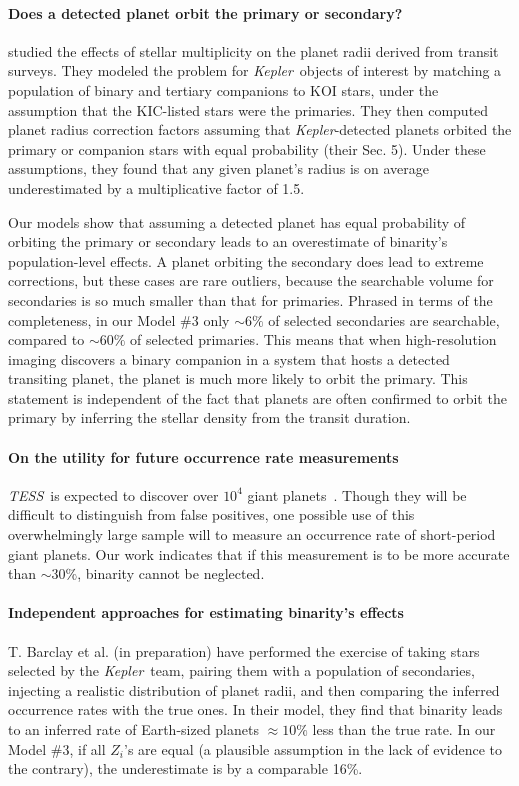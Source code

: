 \paragraph{Does a detected planet orbit the primary or secondary?}
\citet{ciardi_understanding_2015} studied the effects of stellar multiplicity 
on the planet radii derived from transit surveys.
They modeled the problem for {\it Kepler}\ objects of interest by matching a 
population of binary and tertiary companions to KOI stars, 
under the assumption that the KIC-listed stars were the primaries.
They then computed planet radius correction factors assuming that {\it 
Kepler}-detected planets orbited the primary or companion stars
with equal probability (their Sec. 5).
Under these assumptions, they found that any given planet's radius is on 
average underestimated by a multiplicative factor of 1.5.

Our models show that assuming a detected planet has equal probability of 
orbiting the primary or secondary leads to an overestimate of
binarity's population-level effects.
A planet orbiting the secondary does lead to extreme corrections, but these 
cases are rare outliers, because the searchable volume for secondaries is so 
much smaller than that for primaries.
Phrased in terms of the completeness, in our Model \#3 only $\sim 6\%$ of 
selected secondaries are searchable, compared to $\sim 60\%$ of selected 
primaries.
This means that when high-resolution imaging discovers a binary companion in 
a system that hosts a detected transiting planet, the planet is much
more likely to orbit the primary.
This statement is independent of the fact that planets are often confirmed to 
orbit the primary by inferring the stellar density from the transit duration.


\paragraph{On the utility for future occurrence rate measurements}
{\it TESS}\ is expected to discover over $10^4$ giant 
planets~\citep{sullivan_transiting_2015}.
Though they will be difficult to distinguish from false positives, one 
possible use of this overwhelmingly large sample will to measure an
occurrence rate of short-period giant planets.
Our work indicates that if this measurement is to be more accurate than $\sim 
30\%$, binarity cannot be neglected.


\paragraph{Independent approaches for estimating binarity's effects}
T. Barclay et al.\! (in preparation) have performed the exercise of taking 
stars selected by the {\it Kepler}\ team, pairing them with a population of 
secondaries, injecting a realistic distribution of planet radii, 
and then comparing the inferred occurrence rates with the true ones.
In their model, they find that binarity leads to an inferred rate of 
Earth-sized planets $\approx 10\%$ less than the true rate.
In our Model \#3, if all $Z_i$'s are equal (a plausible assumption in 
the lack of evidence to the contrary), the underestimate is by a comparable 
16\%.